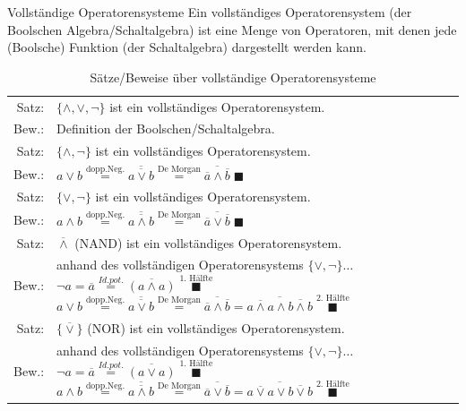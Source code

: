 \documentclass[10pt,a4paper]{scrartcl}
\begin{document}
\begin{Theorem}{Vollständige Operatorensysteme}{}
	Ein vollständiges Operatorensystem (der Boolschen Algebra/Schaltalgebra) ist eine Menge von Operatoren, mit denen jede (Boolsche) Funktion (der Schaltalgebra) dargestellt werden kann.
\end{Theorem}

\begin{table}[h!]
	\centering
	\begin{tabular}{rp{10cm}}
	Satz: & $ \{\wedge, \vee, \neg\} $ ist ein vollständiges Operatorensystem.\\
	Bew.:& Definition der Boolschen/Schaltalgebra.\\ \hline
	Satz: & $ \{\wedge, \neg\} $ ist ein vollständiges Operatorensystem.\\
	Bew.:& $ a \vee b \overset{\text{dopp.Neg.}}{=} \overline{\overline{a\vee b}} \overset{\text{De Morgan}}{=} \overline{\overline{a} \wedge \overline{b}}\; \blacksquare$\\ \hline
	Satz: & $ \{\vee, \neg\} $ ist ein vollständiges Operatorensystem.\\
	Bew.:& $ a \wedge b \overset{\text{dopp.Neg.}}{=} \overline{\overline{a \wedge b}} \overset{\text{De Morgan}}{=} \overline{\overline{a} \vee \overline{b}}\; \blacksquare $\\ \hline
	Satz: & $ \overline{\wedge} $ (\glqq NAND\grqq) ist ein vollständiges Operatorensystem.\\
	Bew.: & anhand des vollständigen Operatorensystems $ \{\vee, \neg\}\ldots $
	\newline $ \neg a = \overline{a} \overset{Id.pot.}{=} \overline{(a \wedge a)} \;\overset{\text{1. Hälfte}}{\blacksquare}$
	\newline $ a \vee b \overset{\text{dopp.Neg.}}{=} \overline{\overline{a \vee b}} \overset{\text{De Morgan}}{=} \overline{\overline{a} \wedge \overline{b}} = \overline{\overline{a \wedge a} \wedge \overline{b \wedge b}} \;\overset{\text{2. Hälfte}}{\blacksquare}$\\ \hline
	Satz: & $ \{\overline{\vee}\} $ (\glqq NOR\grqq) ist ein vollständiges Operatorensystem.\\
	Bew.: &anhand des vollständigen Operatorensystems $ \{\vee, \neg\}\ldots $
	\newline $ \neg a = \overline{a} \overset{Id.pot.}{=} \overline{(a \vee a)} \;\overset{\text{1. Hälfte}}{\blacksquare}$
	\newline $ a \wedge b \overset{\text{dopp.Neg.}}{=} \overline{\overline{a \wedge b}} \overset{\text{De Morgan}}{=} \overline{\overline{a} \vee \overline{b}} = \overline{\overline{a \vee a} \vee \overline{b \vee b}} \;\overset{\text{2. Hälfte}}{\blacksquare}$\\ %
\end{tabular}
\caption{Sätze/Beweise über vollständige Operatorensysteme}
\end{table}
\end{document}
